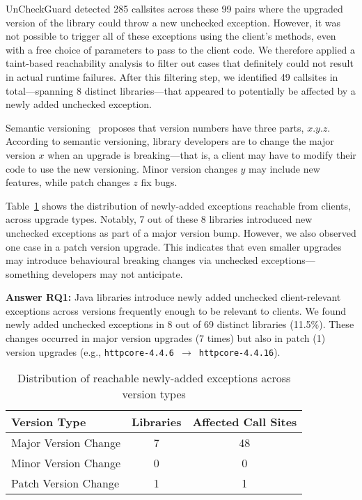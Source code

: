 UnCheckGuard detected 285 callsites across these 99 pairs where the upgraded version of the library could throw a new unchecked exception. However, it was not possible to trigger all of these exceptions using the client's methods, even with a free choice of parameters to pass to the client code. We therefore applied a taint-based reachability analysis to filter out cases that definitely could not result in actual runtime failures. After this filtering step, we identified 49 callsites in total—spanning 8 distinct libraries—that appeared to potentially be affected by a newly added unchecked exception.

Semantic versioning~\cite{preston-werner23:_seman_version} proposes that version numbers have three parts, $x.y.z$. According to semantic versioning, library developers are to change the major version $x$ when an upgrade is breaking---that is, a client may have to modify their code to use the new versioning. Minor version changes $y$ may include new features, while patch changes $z$ fix bugs.

Table~\ref{tab:version-distribution} shows the distribution of newly-added exceptions reachable from clients, across upgrade types. Notably, 7 out of these 8 libraries introduced new unchecked exceptions as part of a major version bump. However, we also observed one case in a patch version upgrade. This indicates that even smaller upgrades may introduce behavioural breaking changes via unchecked exceptions—something developers may not anticipate.


\vspace{1em}
\begin{tcolorbox}[colback=gray!10, colframe=black]
\textbf{Answer RQ1:} Java libraries introduce newly added unchecked client-relevant exceptions across versions frequently enough to be relevant to clients. We found newly added unchecked exceptions in 8 out of 69 distinct libraries (11.5\%). These changes occurred in major version upgrades (7 times) but also in patch (1) version upgrades (e.g., \texttt{httpcore-4.4.6}~$\rightarrow$~\texttt{httpcore-4.4.16}).
\end{tcolorbox}
\vspace{1em}

\begin{table}[h]
\centering
\caption{Distribution of reachable newly-added exceptions across version types}
\label{tab:version-distribution}
\begin{tabular}{lcc}
\toprule
\textbf{Version Type} & \textbf{Libraries} & \textbf{Affected Call Sites} \\
\midrule
Major Version Change & 7 & 48 \\
Minor Version Change & 0 & 0 \\
Patch Version Change & 1 & 1 \\
\bottomrule
\end{tabular}
\end{table}

